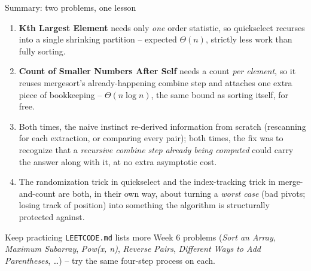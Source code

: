 \documentclass[11pt,aspectratio=169]{beamer}
\begin{document}
\begin{frame}{Summary: two problems, one lesson}
  \footnotesize
  \begin{enumerate}
    \item \textbf{Kth Largest Element} needs only \emph{one} order statistic, so
    quickselect recurses into a single shrinking partition -- expected $\Theta(n)$,
    strictly less work than fully sorting.
    \item \textbf{Count of Smaller Numbers After Self} needs a count \emph{per element},
    so it reuses mergesort's already-happening combine step and attaches one extra piece
    of bookkeeping -- $\Theta(n \log n)$, the same bound as sorting itself, for free.
    \item Both times, the naive instinct re-derived information from scratch (rescanning
    for each extraction, or comparing every pair); both times, the fix was to recognize
    that a \emph{recursive combine step already being computed} could carry the answer
    along with it, at no extra asymptotic cost.
    \item The randomization trick in quickselect and the index-tracking trick in
    merge-and-count are both, in their own way, about turning a \emph{worst case} (bad
    pivots; losing track of position) into something the algorithm is structurally
    protected against.
  \end{enumerate}
  \begin{alertblock}{Keep practicing}
    \texttt{LEETCODE.md} lists more Week 6 problems (\emph{Sort an Array}, \emph{Maximum
    Subarray}, \emph{Pow(x, n)}, \emph{Reverse Pairs}, \emph{Different Ways to Add
    Parentheses}, \dots) -- try the same four-step process on each.
  \end{alertblock}
\end{frame}
\end{document}
